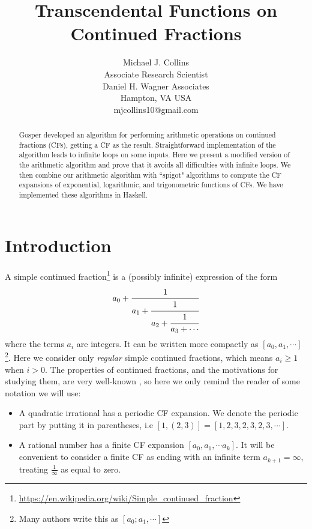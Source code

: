 \documentclass[11pt, oneside]{amsart}   	%
\title{Transcendental Functions on Continued Fractions}
\author{Michael J. Collins\\Associate Research Scientist\\Daniel H. Wagner Associates\\Hampton, VA USA\\mjcollins10@gmail.com}
\renewcommand{\:}{\negthickspace:\negthickspace}
\begin{document}
\begin{abstract}
Gosper  developed an algorithm for performing arithmetic operations on continued fractions (CFs), getting a CF as the result. Straightforward implementation of the algorithm leads to infinite loops on some inputs.
Here we present a modified version of the arithmetic algorithm and prove that it avoids all difficulties with infinite loops.
We then combine our arithmetic algorithm with ``spigot" algorithms to compute the CF expansions of exponential, logarithmic, and trigonometric functions of CFs.
We have implemented these algorithms in Haskell.
\end{abstract}

\maketitle

\section{Introduction}
A simple continued fraction\footnote{\href{https://en.wikipedia.org/wiki/Simple\_continued\_fraction}{https://en.wikipedia.org/wiki/Simple\_continued\_fraction}} is a (possibly infinite) expression of the form
\begin{equation*}
a_0+\cfrac{1}{a_1+\cfrac{1}{a_2+\cfrac{1}{a_3+\cdots}}}
\end{equation*}
where the terms $a_i$ are integers. It can be written more compactly as $[a_0, a_1, \cdots]$\footnote{Many authors write this as $[a_0; a_1, \cdots]$}. Here we consider only \emph{regular} simple continued fractions, which means $a_i \geq 1$ when $i>0$. The
properties of continued fractions, and the motivations for studying them, are very well-known \cite{rockett1992continued},
so here we only remind the reader of some notation we will use:
\begin{itemize}
\item A quadratic irrational has a periodic CF expansion. We denote the periodic part by putting it in parentheses,
i.e $[1,(2,3)] = [1,2,3,2,3,2,3,\cdots]$.
\item A rational number has a finite CF expansion $[a_0,a_1, \cdots a_k]$.
It will be convenient to consider a finite CF as ending with an infinite term $a_{k+1}=\infty$, treating $\frac{1}{\infty}$ as equal to zero.
\end{itemize}
 
\end{document}
